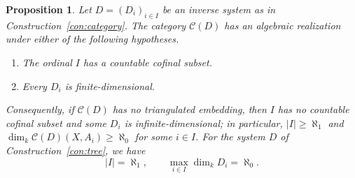 \documentclass[a4paper,reqno,10pt]{amsart}
\numberwithin{equation}{section}
\newtheorem{proposition}[theorem]{Proposition}
\theoremstyle{definition}
\newcommand{\C}{\mathcal C}
\begin{document}
\begin{proposition}\label{prop:bounds}
Let $D=(D_i)_{i\in I}$ be an inverse system as in
Construction~\ref{con:category}. The category $\C(D)$ has an algebraic
realization under either of the following hypotheses.
\begin{enumerate}
\item The ordinal $I$ has a countable cofinal subset.
\item Every $D_i$ is finite-dimensional.
\end{enumerate}
Consequently, if $\C(D)$ has no triangulated embedding, then $I$ has no
countable cofinal subset and some $D_i$ is infinite-dimensional; in particular,
$|I|\ge\aleph_1$ and $\dim_k\C(D)(X,A_i)\ge\aleph_0$ for some $i\in I$. For the
system $D$ of Construction~\ref{con:tree}, we have
\[
  |I|=\aleph_1,\qquad \max_{i\in I}\dim_k D_i=\aleph_0 .
\]
\end{proposition}
\end{document}
